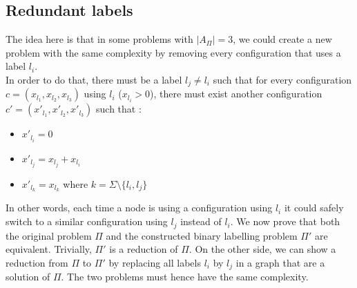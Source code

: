 \subsection{Redundant labels}
The idea here is that in some problems with $|A_{\Pi}|=3$, we could create a new problem with the same complexity by removing every configuration that uses a label $l_i$.\\
In order to do that, there must be a label $l_j\neq l_i$ such that for every configuration $c=(x_{l_1},x_{l_2},x_{l_3})$ using $l_i$ ($x_{l_i}>0$), there must exist another configuration $c'=(x'_{l_1},x'_{l_2},x'_{l_3})$ such that : 
\begin{itemize}
    \item $x'_{l_i}=0$
    \item $x'_{l_j}= x_{l_j}+x_{l_i}$
    \item $x'_{l_k} = x_{l_k}$ where $ k = \Sigma \setminus \{l_i,l_j\}$ 
\end{itemize}
In other words, each time a node is using a configuration using $l_i$ it could safely switch to a similar configuration using $l_j$ instead of $l_i$.
We now prove that both the original problem $\Pi$ and the constructed binary labelling problem $\Pi'$ are equivalent.
Trivially, $\Pi'$ is a reduction of $\Pi$. On the other side, we can show a reduction from $\Pi$ to $\Pi'$ by replacing all labels $l_i$ by $l_j$ in a graph that are a solution of $\Pi$. The two problems must hence have the same complexity.

